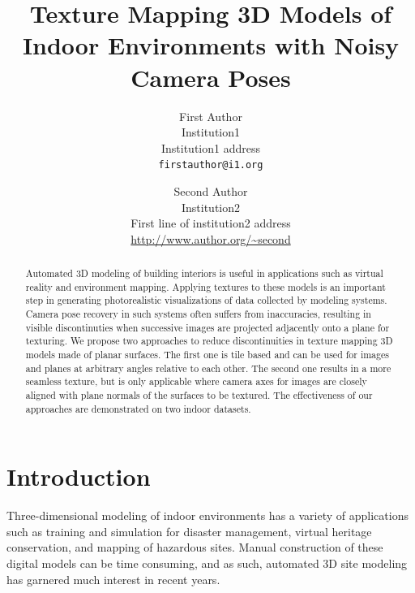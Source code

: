 \documentclass[10pt,twocolumn,letterpaper]{article}
\begin{document}
\title{Texture Mapping 3D Models of Indoor Environments with Noisy
  Camera Poses}

\author{First Author\\
  Institution1\\
  Institution1 address\\
  {\tt\small firstauthor@i1.org}
  \and
  Second Author\\
  Institution2\\
  First line of institution2 address\\
  {\small\url{http://www.author.org/~second}} }

\maketitle

\begin{abstract}
  Automated 3D modeling of building interiors is useful in
  applications such as virtual reality and environment
  mapping. Applying textures to these models is an important step in
  generating photorealistic visualizations of data collected by
  modeling systems. Camera pose recovery in such systems often suffers
  from inaccuracies, resulting in visible discontinuties when
  successive images are projected adjacently onto a plane for
  texturing. We propose two approaches to reduce discontinuities in
  texture mapping 3D models made of planar surfaces. The first one is
  tile based and can be used for images and planes at arbitrary angles
  relative to each other. The second one results in a more seamless
  texture, but is only applicable where camera axes for images are
  closely aligned with plane normals of the surfaces to be
  textured. The effectiveness of our approaches are demonstrated on
  two indoor datasets.
\end{abstract}

\section{Introduction}
\label{sec:introduction}
Three-dimensional modeling of indoor environments has a variety of
applications such as training and simulation for disaster management,
virtual heritage conservation, and mapping of hazardous sites. Manual
construction of these digital models can be time consuming, and as
such, automated 3D site modeling has garnered much interest in recent
years.
\end{document}

